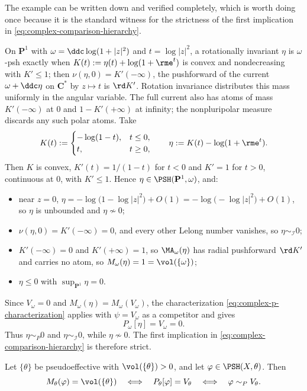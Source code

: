 The example can be written down and verified completely, which is worth
doing once because it is the standard witness for the strictness of the
first implication in \eqref{eq:complex-comparison-hierarchy}.

\begin{remark}
\label{rem:ch51-loglog-explicit}
On $\mathbf P^1$ with $\omega=\ddc\log(1+|z|^2)$ and
$t=\log|z|^2$, a rotationally invariant $\eta$ is $\omega$-psh
exactly when $K(t):=\eta(t)+\log(1+\rme^t)$ is convex and
nondecreasing with $K'\leq1$; then $\nu(\eta,0)=K'(-\infty)$, the
pushforward of the current $\omega+\ddc\eta$ on $\mathbf C^*$
by $z\mapsto t$ is $\rd K'$.  Rotation invariance distributes this
mass uniformly in the angular variable.  The full current also has atoms
of mass $K'(-\infty)$ at $0$ and $1-K'(+\infty)$ at infinity;
the nonpluripolar measure discards any such polar atoms.
Take
\[
 K(t):=
 \begin{cases}
 -\log(1-t), & t\leq0,\\
 t, & t\geq0 ,
 \end{cases}
 \qquad
 \eta:=K(t)-\log(1+\rme^t).
\]
Then $K$ is convex, $K'(t)=1/(1-t)$ for $t<0$ and $K'=1$ for
$t>0$, continuous at $0$, with $K'\leq1$.  Hence
$\eta\in\PSH(\mathbf P^1,\omega)$, and:
\begin{itemize}
\item near $z=0$, $\eta=-\log\bigl(1-\log|z|^2\bigr)+O(1)
      =-\log\bigl(-\log|z|^2\bigr)+O(1)$, so $\eta$ is unbounded and
      $\eta\not\sim0$;
\item $\nu(\eta,0)=K'(-\infty)=0$, and every other Lelong number
      vanishes, so $\eta\sim_{\mathcal I}0$;
\item $K'(-\infty)=0$ and $K'(+\infty)=1$, so
      $\MA_\omega(\eta)$ has radial pushforward $\rd K'$ and
      carries no atom, so $M_\omega(\eta)=1=\vol(\{\omega\})$;
\item $\eta\leq0$ with $\sup_{\mathbf P^1}\eta=0$.
\end{itemize}
Since $V_\omega=0$ and $M_\omega(\eta)=M_\omega(V_\omega)$, the
characterization \eqref{eq:complex-p-characterization} applies with
$\psi=V_\omega$ as a competitor and gives
\[
 P_\omega[\eta]=V_\omega=0 .
\]
Thus $\eta\sim_P0$ and $\eta\sim_{\mathcal I}0$, while
$\eta\not\sim0$.  The first implication in
\eqref{eq:complex-comparison-hierarchy} is therefore strict.
\end{remark}

\begin{corollary}
\label{cor:ch51-full-mass-envelope}
Let $\{\theta\}$ be pseudoeffective with $\vol(\{\theta\})>0$, and let
$\varphi\in\PSH(X,\theta)$.  Then
\[
 M_\theta(\varphi)=\vol(\{\theta\})
 \quad\Longleftrightarrow\quad
 P_\theta[\varphi]=V_\theta
 \quad\Longleftrightarrow\quad
 \varphi\sim_PV_\theta .
\]
\end{corollary}

